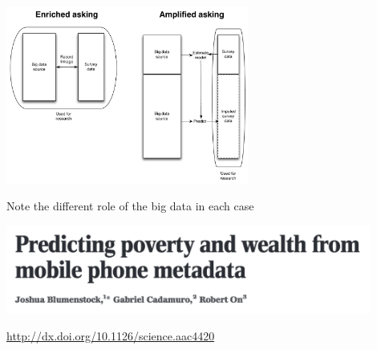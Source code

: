 \documentclass[aspectratio=169]{beamer}
\begin{document}
\begin{frame}

\begin{center}
\includegraphics[width=0.6\textwidth]{figures/bitbybit3-12_found_survey_combined}
\end{center}

Note the different role of the big data in each case

\end{frame}
\begin{frame}

\begin{center}
\includegraphics[width=0.9\textwidth]{figures/blumenstock_predicting_2015_title}
\end{center}

\vfill
\url{http://dx.doi.org/10.1126/science.aac4420}
\end{frame}
\end{document}
